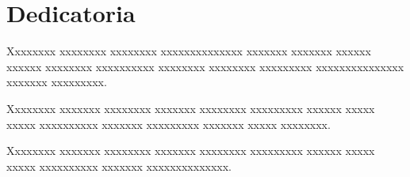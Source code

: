 \chapter*{Dedicatoria}

\vspace{2cm}

Xxxxxxxx xxxxxxxx xxxxxxxx xxxxxxxxxxxxxx xxxxxxx xxxxxxx xxxxxx xxxxxx xxxxxxxx xxxxxxxxxx xxxxxxxx xxxxxxxx xxxxxxxxx xxxxxxxxxxxxxxx xxxxxxx xxxxxxxxx.

Xxxxxxxx xxxxxxx xxxxxxxx xxxxxxx xxxxxxxx xxxxxxxxx xxxxxx xxxxx xxxxx xxxxxxxxxx xxxxxxx xxxxxxxxx xxxxxxx xxxxx xxxxxxxx.

Xxxxxxxx xxxxxxx xxxxxxxx xxxxxxx xxxxxxxx xxxxxxxxx xxxxxx xxxxx xxxxx xxxxxxxxxx xxxxxxx xxxxxxxxxxxxxx.
